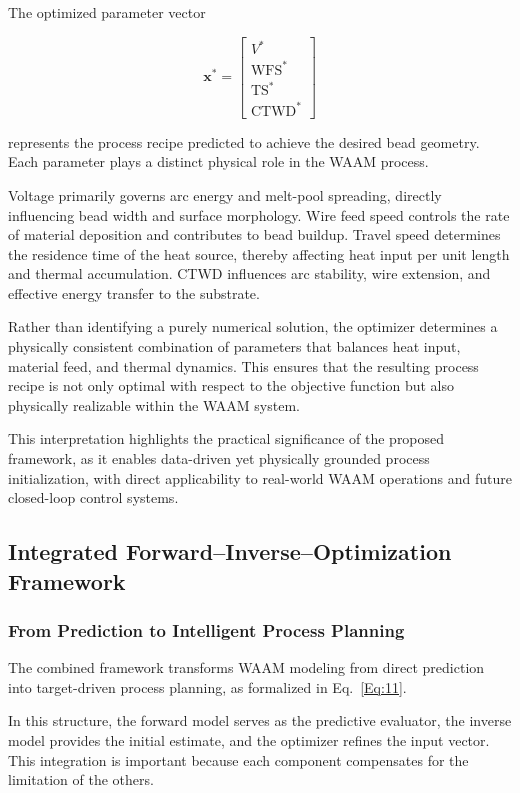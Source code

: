 \documentclass[11pt]{article}
\begin{document}
The optimized parameter vector

\begin{equation}
\mathbf{x}^{*} =
\begin{bmatrix}
V^{*} \\
\mathrm{WFS}^{*} \\
\mathrm{TS}^{*} \\
\mathrm{CTWD}^{*}
\end{bmatrix}
\end{equation}

represents the process recipe predicted to achieve the desired bead geometry. Each parameter plays a distinct physical role in the WAAM process.

Voltage primarily governs arc energy and melt-pool spreading, directly influencing bead width and surface morphology. Wire feed speed controls the rate of material deposition and contributes to bead buildup. Travel speed determines the residence time of the heat source, thereby affecting heat input per unit length and thermal accumulation. CTWD influences arc stability, wire extension, and effective energy transfer to the substrate.

Rather than identifying a purely numerical solution, the optimizer determines a physically consistent combination of parameters that balances heat input, material feed, and thermal dynamics. This ensures that the resulting process recipe is not only optimal with respect to the objective function but also physically realizable within the WAAM system.

This interpretation highlights the practical significance of the proposed framework, as it enables data-driven yet physically grounded process initialization, with direct applicability to real-world WAAM operations and future closed-loop control systems.
\subsection{Integrated Forward--Inverse--Optimization Framework}

\subsubsection{From Prediction to Intelligent Process Planning}

The combined framework transforms WAAM modeling from direct prediction into target-driven process planning, as formalized in Eq.~\ref{Eq:11}.

In this structure, the forward model serves as the predictive evaluator, the inverse model provides the initial estimate, and the optimizer refines the input vector. This integration is important because each component compensates for the limitation of the others.
\end{document}
